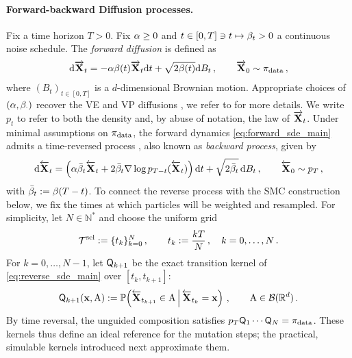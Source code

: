 \documentclass[11pt]{article}
\theoremstyle{plain}
\theoremstyle{definition}
\theoremstyle{remark}
\begin{document}
\paragraph{Forward-backward Diffusion processes.} Fix a time horizon $T>0$. Fix $\alpha\geq 0$ and $t \in [0,T]\ni t\mapsto \beta_{t}>0$ a continuous noise schedule. The \emph{forward diffusion} is defined as
\begin{align}
\label{eq:forward_sde_main}
    \mathrm{d} \overrightarrow{\mathbf{X}}_t = -\alpha \beta(t)  \overrightarrow{\mathbf{X}}_t \mathrm{d} t + \sqrt{2\beta(t)} \mathrm{d} B_t \,,
    \qquad \overrightarrow{\mathbf{X}}_0\sim \pi_{\mathrm{data}} \,,
\end{align}
where $(B_t)_{t \in [0,T]}$ is a $d$-dimensional Brownian motion. Appropriate choices of $(\alpha,\beta_{\cdot})$ recover the VE and VP diffusions \citep{song2019generative,dickstein2015,ho2020denoising}, we refer to \citet{strasman2026forgetting} for more details. We write $p_t$ to refer to both the density and, by abuse of notation, the law of $\overrightarrow{\mathbf{X}}_t$. %
Under minimal assumptions on $\pi_{\rm data}$, the forward dynamics \eqref{eq:forward_sde_main} admits a time-reversed process \citep{haussmann1986time,cattiaux}, also known as \emph{backward process}, given by
\begin{align}
\label{eq:reverse_sde_main}
    \mathrm{d} \overleftarrow{\mathbf{X}}_t = \left( \alpha \bar{\beta}_{t}\overleftarrow{\mathbf{X}}_t + 2\bar{\beta}_{t}\nabla \log p_{T-t}(\overleftarrow{\mathbf{X}}_t) \right)\mathrm{d} t + \sqrt{2\bar{\beta}_{t}}\,\mathrm{d} B_t \,, \qquad \overleftarrow{\mathbf{X}}_0\sim p_T \,,
\end{align}
with $\bar{\beta}_{t}:=\beta(T-t)$. %
To connect the reverse process with the SMC construction below, we fix the times at which particles will be weighted and resampled. For simplicity, let $N\in\mathbb N^\ast$ and choose the uniform grid
$$
\mathcal T^{\rm sel}:=\{t_k\}_{k=0}^N \,, \qquad t_k:= \frac{kT}{N} \,,  \quad k=0,\ldots,N \,.
$$
For $k=0,\ldots,N-1$, let $\mk{k+1}$ be the exact transition kernel
of \eqref{eq:reverse_sde_main} over $[t_k,t_{k+1}]$:
$$
\mk{k+1}(\x,\set{A}) \eqdef \mathbb P\!\left( \Xola_{t_{k+1}}\in\set{A} \,\middle|\, \Xola_{t_k}=\x \right) \eqsp, \qquad \set{A}\in\borelians{\rset^\xdim} \eqsp.
$$
By time reversal, the unguided composition satisfies
$p_T\mk{1}\cdots\mk{N}=\pidata$. These kernels thus define an ideal reference for the mutation steps; the practical, simulable kernels introduced next approximate them. 
\end{document}
